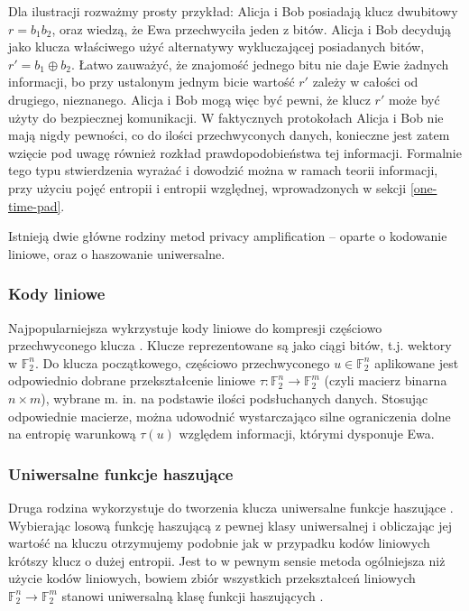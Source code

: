 \documentclass[10pt]{article}
\begin{document}
Dla ilustracji rozważmy prosty przykład: Alicja i Bob posiadają klucz dwubitowy \(r = b_1 b_2\), oraz
wiedzą, że Ewa przechwyciła jeden z bitów. Alicja i Bob decydują jako klucza właściwego użyć alternatywy
wykluczającej posiadanych bitów, \(r' = b_1 \oplus b_2\). Łatwo zauważyć, że znajomość jednego bitu
nie daje Ewie żadnych informacji, bo przy ustalonym jednym bicie wartość \(r'\) zależy w całości od 
drugiego, nieznanego. Alicja i Bob mogą więc być pewni, że klucz \(r'\) może być użyty do bezpiecznej
komunikacji. W faktycznych protokołach Alicja i Bob nie mają nigdy pewności, co do ilości przechwyconych 
danych, konieczne jest zatem wzięcie pod uwagę również rozkład prawdopodobieństwa tej informacji. 
Formalnie tego typu stwierdzenia wyrażać i dowodzić można w ramach teorii informacji, przy użyciu pojęć
entropii i entropii względnej, wprowadzonych w sekcji \ref{one-time-pad}.

Istnieją dwie główne rodziny metod privacy amplification -- oparte o kodowanie liniowe, oraz o
haszowanie uniwersalne.

\subsubsection*{Kody liniowe}
Najpopularniejsza wykrzystuje kody liniowe do kompresji częściowo przechwyconego klucza \cite{Mayers01}.
Klucze reprezentowane są jako ciągi bitów, t.j. wektory w \(\mathbb{F}_2^n\). Do klucza początkowego,
częściowo przechwyconego \(u\in\mathbb{F}_2^n\) aplikowane jest odpowiednio dobrane przekształcenie 
liniowe \(\tau\colon\mathbb{F}_2^n\rightarrow \mathbb{F}_2^m\) (czyli macierz binarna \(n\times m\)), 
wybrane m. in. na podstawie ilości podsłuchanych danych. Stosując odpowiednie macierze, można udowodnić
wystarczająco silne ograniczenia dolne na entropię warunkową \(\tau(u)\) względem informacji,
którymi dysponuje Ewa.

\subsubsection*{Uniwersalne funkcje haszujące}

Druga rodzina wykorzystuje do tworzenia klucza uniwersalne funkcje haszujące \cite{Bennett95,Watanabe07}.
Wybierając losową funkcję haszującą z pewnej klasy uniwersalnej i obliczając jej wartość na kluczu
otrzymujemy podobnie jak w przypadku kodów liniowych krótszy klucz o dużej entropii. Jest to w pewnym
sensie metoda ogólniejsza niż użycie kodów liniowych, bowiem zbiór wszystkich przekształceń liniowych
\(\mathbb{F}_2^n\rightarrow \mathbb{F}_2^m\) stanowi uniwersalną klasę funkcji haszujących 
\cite{Carter79}.
\end{document}
